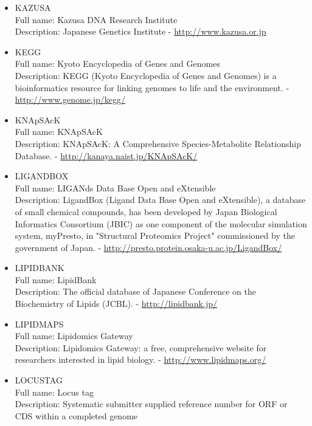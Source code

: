 \begin{itemize}
\item{KAZUSA}\\ Full name: Kazusa DNA Research Institute\\ Description: Japanese Genetics Institute - 
\url{http://www.kazusa.or.jp}

\item{KEGG}\\ Full name: Kyoto Encyclopedia of Genes and Genomes\\ Description: KEGG (Kyoto Encyclopedia of Genes and Genomes) is a bioinformatics resource for linking genomes to life and the environment. - 
\url{http://www.genome.jp/kegg/}

\item{KNApSAcK}\\ Full name: KNApSAcK\\ Description: KNApSAcK: A Comprehensive Species-Metabolite Relationship Database. - 
\url{http://kanaya.naist.jp/KNApSAcK/}

\item{LIGANDBOX}\\ Full name: LIGANds Data Base Open and eXtensible\\ Description: LigandBox (Ligand Data Base Open and eXtensible), a database of small chemical compounds, has been developed by Japan Biological Informatics Consortium (JBIC) as one component of the molecular simulation system, myPresto, in "Structural Proteomics Project" commissioned by the government of Japan. - 
\url{http://presto.protein.osaka-u.ac.jp/LigandBox/}

\item{LIPIDBANK}\\ Full name: LipidBank\\ Description: The official database of Japanese Conference on the Biochemistry of Lipids (JCBL). - 
\url{http://lipidbank.jp/}

\item{LIPIDMAPS}\\ Full name: Lipidomics Gateway\\ Description: Lipidomics Gateway: a free, comprehensive website for researchers interested in lipid biology. - 
\url{http://www.lipidmaps.org/}

\item{LOCUSTAG}\\ Full name: Locus tag\\ Description: Systematic submitter supplied reference number for ORF or CDS within a completed genome 


\end{itemize}
